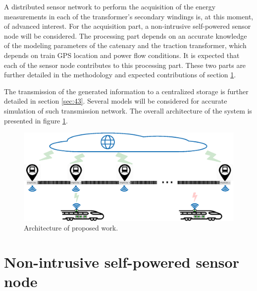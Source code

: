 A distributed sensor network to perform the acquisition of the energy measurements in each of the transformer's secondary windings is, at this moment, of advanced interest.
For the acquisition part, a non-intrusive self-powered sensor node will be considered.
The processing part depends on an accurate knowledge of the modeling parameters of the catenary and the traction transformer, which depends on train GPS location and power flow conditions. 
It is expected that each of the sensor node contributes to this processing part.
These two parts are further detailed in the methodology and expected contributions of section \ref{sec:42}.



The transmission of the generated information to a centralized storage is further detailed in section \ref{sec:43}. Several models will be considered for accurate simulation of such transmission network. The overall architecture of the system is presented in figure \ref{fig:41architecture}.

\begin{figure}[h!]
	\centering
	\includegraphics[width=1.0\textwidth,keepaspectratio]{figures/architecture}
	\caption{Architecture of proposed work.}
	\label{fig:41architecture}
\end{figure}







\section{Non-intrusive self-powered sensor node}
\label{sec:42}
